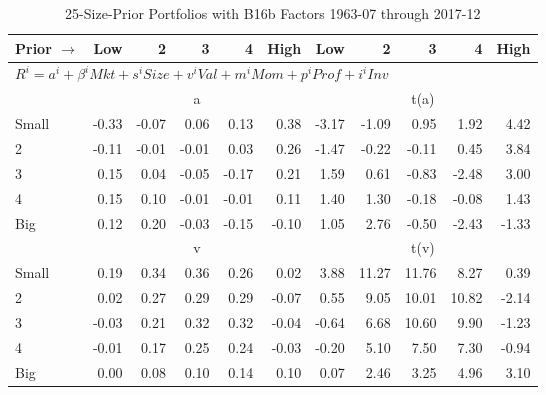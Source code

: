 
\begin{table}[!ht]
\footnotesize
\centering
\caption{25-Size-Prior Portfolios with B16b Factors 1963-07 through 2017-12}
\begin{tabular}{lrrrrrrrrrr}
  \toprule
    Prior $\rightarrow$ & Low & 2 & 3 & 4 & High & Low & 2 & 3 & 4 & High \\ 
  \midrule
  \multicolumn{11}{l}{$R^i=a^i+\beta^iMkt+s^iSize+v^iVal+m^iMom+p^iProf+i^iInv$} \\

  
    
      & \multicolumn{5}{c}{a} & \multicolumn{5}{c}{t(a)}
    
    \\
      \cmidrule(r){2-6} \cmidrule(r){7-11}

    Small   & -0.33  & -0.07  & 0.06  & 0.13  & 0.38  & -3.17  & -1.09  & 0.95  & 1.92  & 4.42  \\
         2  & -0.11  & -0.01  & -0.01  & 0.03  & 0.26  & -1.47  & -0.22  & -0.11  & 0.45  & 3.84  \\
         3  & 0.15  & 0.04  & -0.05  & -0.17  & 0.21  & 1.59  & 0.61  & -0.83  & -2.48  & 3.00  \\
         4  & 0.15  & 0.10  & -0.01  & -0.01  & 0.11  & 1.40  & 1.30  & -0.18  & -0.08  & 1.43  \\
    Big     & 0.12  & 0.20  & -0.03  & -0.15  & -0.10  & 1.05  & 2.76  & -0.50  & -2.43  & -1.33  \\

  
    
      & \multicolumn{5}{c}{v} & \multicolumn{5}{c}{t(v)}
    
    \\
      \cmidrule(r){2-6} \cmidrule(r){7-11}

    Small   & 0.19  & 0.34  & 0.36  & 0.26  & 0.02  & 3.88  & 11.27  & 11.76  & 8.27  & 0.39  \\
         2  & 0.02  & 0.27  & 0.29  & 0.29  & -0.07  & 0.55  & 9.05  & 10.01  & 10.82  & -2.14  \\
         3  & -0.03  & 0.21  & 0.32  & 0.32  & -0.04  & -0.64  & 6.68  & 10.60  & 9.90  & -1.23  \\
         4  & -0.01  & 0.17  & 0.25  & 0.24  & -0.03  & -0.20  & 5.10  & 7.50  & 7.30  & -0.94  \\
    Big     & 0.00  & 0.08  & 0.10  & 0.14  & 0.10  & 0.07  & 2.46  & 3.25  & 4.96  & 3.10  \\

  
    

\end{tabular}
\end{table}
